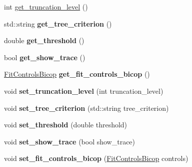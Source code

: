\begin{DoxyCompactItemize}
\item 
int \hyperlink{classvinecopulib_1_1_fit_controls_vinecop_af405b1b6776984dd4d0c99797c6484f6}{get\+\_\+truncation\+\_\+level} ()
\item 
std\+::string {\bfseries get\+\_\+tree\+\_\+criterion} ()\hypertarget{classvinecopulib_1_1_fit_controls_vinecop_a18eb3146c2a63a7faf29aa57fa51c5b1}{}\label{classvinecopulib_1_1_fit_controls_vinecop_a18eb3146c2a63a7faf29aa57fa51c5b1}

\item 
double {\bfseries get\+\_\+threshold} ()\hypertarget{classvinecopulib_1_1_fit_controls_vinecop_a6668918e9a346bad9df664293720f55c}{}\label{classvinecopulib_1_1_fit_controls_vinecop_a6668918e9a346bad9df664293720f55c}

\item 
bool {\bfseries get\+\_\+show\+\_\+trace} ()\hypertarget{classvinecopulib_1_1_fit_controls_vinecop_a5aafa14743adff658bd67704fb55bbd4}{}\label{classvinecopulib_1_1_fit_controls_vinecop_a5aafa14743adff658bd67704fb55bbd4}

\item 
\hyperlink{classvinecopulib_1_1_fit_controls_bicop}{Fit\+Controls\+Bicop} {\bfseries get\+\_\+fit\+\_\+controls\+\_\+bicop} ()\hypertarget{classvinecopulib_1_1_fit_controls_vinecop_a07e4ef29a10e76f8e0feb8a5c4b17ed3}{}\label{classvinecopulib_1_1_fit_controls_vinecop_a07e4ef29a10e76f8e0feb8a5c4b17ed3}

\item 
void {\bfseries set\+\_\+truncation\+\_\+level} (int truncation\+\_\+level)\hypertarget{classvinecopulib_1_1_fit_controls_vinecop_a7ab28ec859e3a0cd4db6fd4a4c68e3d5}{}\label{classvinecopulib_1_1_fit_controls_vinecop_a7ab28ec859e3a0cd4db6fd4a4c68e3d5}

\item 
void {\bfseries set\+\_\+tree\+\_\+criterion} (std\+::string tree\+\_\+criterion)\hypertarget{classvinecopulib_1_1_fit_controls_vinecop_ac51c634095193c976135f57822a53069}{}\label{classvinecopulib_1_1_fit_controls_vinecop_ac51c634095193c976135f57822a53069}

\item 
void {\bfseries set\+\_\+threshold} (double threshold)\hypertarget{classvinecopulib_1_1_fit_controls_vinecop_a774ebb065432b9e5f5add91ad3a6b137}{}\label{classvinecopulib_1_1_fit_controls_vinecop_a774ebb065432b9e5f5add91ad3a6b137}

\item 
void {\bfseries set\+\_\+show\+\_\+trace} (bool show\+\_\+trace)\hypertarget{classvinecopulib_1_1_fit_controls_vinecop_afc9f77d566a0d70675e1858c7c09a897}{}\label{classvinecopulib_1_1_fit_controls_vinecop_afc9f77d566a0d70675e1858c7c09a897}

\item 
void {\bfseries set\+\_\+fit\+\_\+controls\+\_\+bicop} (\hyperlink{classvinecopulib_1_1_fit_controls_bicop}{Fit\+Controls\+Bicop} controls)\hypertarget{classvinecopulib_1_1_fit_controls_vinecop_a6ed63d403dc902119ebe0252ada0be47}{}\label{classvinecopulib_1_1_fit_controls_vinecop_a6ed63d403dc902119ebe0252ada0be47}

\end{DoxyCompactItemize}
